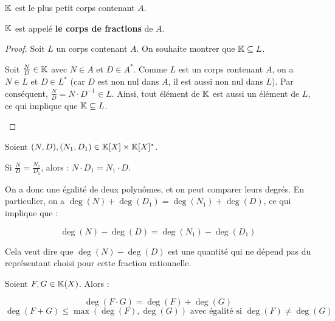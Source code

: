 \documentclass[12pt,a4paper]{report}
\begin{document}
\begin{theorem}
    $\mathbb{K}$ est le plus petit corps contenant $A$.

    $\mathbb{K}$ est appelé \textbf{le corps de fractions} de $A$.
\end{theorem}

\begin{proof}
    Soit $L$ un corps contenant $A$. On souhaite montrer que $\mathbb{K} \subseteq L$.

    \begin{outline}
        \1 Soit $\frac ND \in \mathbb{K}$ avec $N \in A$ et $D \in A^*$. Comme $L$ est un corps contenant $A$, on a $N \in L$ et $D \in L^*$ (car $D$ est non nul dans $A$, il est aussi non nul dans $L$).
        \1 Par conséquent, $\frac ND = N \cdot D^{-1} \in L$.
        \1 Ainsi, tout élément de $\mathbb{K}$ est aussi un élément de $L$, ce qui implique que $\mathbb{K} \subseteq L$.
    \end{outline}
\end{proof}

\begin{property}
    Soient $(N,D),(N_1,D_1) \in \mathbb{K}[X]\times\mathbb{K}[X]^*$.

    Si $\frac ND = \frac{N_1}{D_1}$, alors : $N \cdot D_1 = N_1 \cdot D$.

    On a donc une égalité de deux polynômes, et on peut comparer leurs degrés. En particulier, on a $\deg(N) + \deg(D_1) = \deg(N_1) + \deg(D)$, ce qui implique que :

    $$\deg(N) - \deg(D) = \deg(N_1) - \deg(D_1)$$

    Cela veut dire que $\deg(N) - \deg(D)$ est une quantité qui ne dépend pas du représentant choisi pour cette fraction rationnelle.
\end{property}

\begin{property}
    Soient $F, G \in \mathbb{K}(X)$. Alors :

    $$\deg(F\cdot G) = \deg(F) + \deg(G)$$
    $$\deg(F + G) \leq \max(\deg(F), \deg(G)) \text{ avec égalité si } \deg(F) \neq \deg(G)$$
\end{property}
\end{document}
